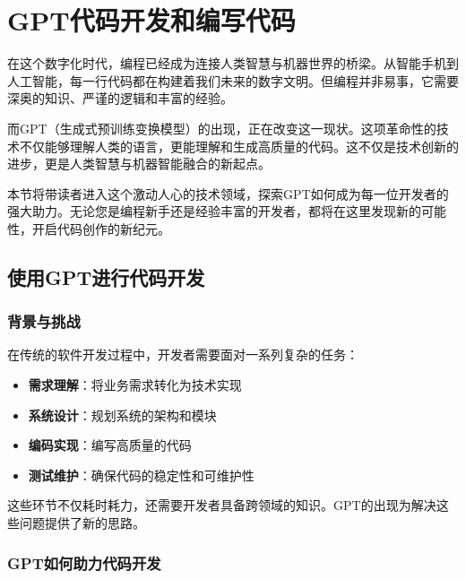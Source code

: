 \hypertarget{gptux4ee3ux7801ux5f00ux53d1ux548cux7f16ux5199ux4ee3ux7801}{%
  \section{GPT代码开发和编写代码}\label{gptux4ee3ux7801ux5f00ux53d1ux548cux7f16ux5199ux4ee3ux7801}}


在这个数字化时代，编程已经成为连接人类智慧与机器世界的桥梁。从智能手机到人工智能，每一行代码都在构建着我们未来的数字文明。但编程并非易事，它需要深奥的知识、严谨的逻辑和丰富的经验。

而GPT（生成式预训练变换模型）的出现，正在改变这一现状。这项革命性的技术不仅能够理解人类的语言，更能理解和生成高质量的代码。这不仅是技术创新的进步，更是人类智慧与机器智能融合的新起点。

本节将带读者进入这个激动人心的技术领域，探索GPT如何成为每一位开发者的强大助力。无论您是编程新手还是经验丰富的开发者，都将在这里发现新的可能性，开启代码创作的新纪元。

\hypertarget{ux4f7fux7528gptux8fdbux884cux4ee3ux7801ux5f00ux53d1}{%
  \subsection{使用GPT进行代码开发}\label{ux4f7fux7528gptux8fdbux884cux4ee3ux7801ux5f00ux53d1}}

\hypertarget{ux80ccux666fux4e0eux6311ux6218}{%
  \subsubsection{背景与挑战}\label{ux80ccux666fux4e0eux6311ux6218}}

在传统的软件开发过程中，开发者需要面对一系列复杂的任务：

\begin{itemize}
  \item
        \textbf{需求理解}：将业务需求转化为技术实现
  \item
        \textbf{系统设计}：规划系统的架构和模块
  \item
        \textbf{编码实现}：编写高质量的代码
  \item
        \textbf{测试维护}：确保代码的稳定性和可维护性
\end{itemize}

这些环节不仅耗时耗力，还需要开发者具备跨领域的知识。GPT的出现为解决这些问题提供了新的思路。

\hypertarget{gptux5982ux4f55ux52a9ux529bux4ee3ux7801ux5f00ux53d1}{%
  \subsubsection{GPT如何助力代码开发}\label{gptux5982ux4f55ux52a9ux529bux4ee3ux7801ux5f00ux53d1}}

